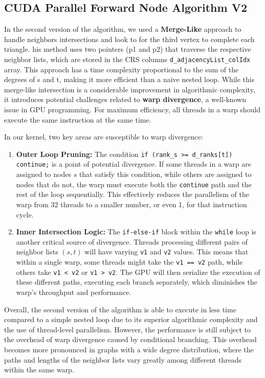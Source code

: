 \documentclass{aes2e}
\begin{document}
\subsection{CUDA Parallel Forward Node Algorithm V2}
In the second version of the algorithm, we used a \textbf{Merge-Like} approach to handle neighbors intersections and look to for the third vertex to complete each triangle. his method uses two pointers (p1 and p2) that traverse the respective neighbor lists, which are stored in the CRS columns \texttt{d\_adjacencyList\_colIdx} array. This approach has a time complexity proportional to the sum of the degrees of s and t, making it more efficient than a naive nested loop. 
While this merge-like intersection is a considerable improvement in algorithmic complexity, it introduces potential challenges related to \textbf{warp divergence}, a well-known issue in GPU programming. For maximum efficiency, all threads in a warp should execute the same instruction at the same time.

In our kernel, two key areas are susceptible to warp divergence:

\begin{enumerate}
    \item \textbf{Outer Loop Pruning:} The condition \texttt{if (rank\_s >= d\_ranks[t]) continue;} is a point of potential divergence. If some threads in a warp are assigned to nodes $s$ that satisfy this condition, while others are assigned to nodes that do not, the warp must execute both the \texttt{continue} path and the rest of the loop sequentially. This effectively reduces the parallelism of the warp from 32 threads to a smaller number, or even 1, for that instruction cycle.
    
    \item \textbf{Inner Intersection Logic:} The \texttt{if-else-if} block within the \texttt{while} loop is another critical source of divergence. Threads processing different pairs of neighbor lists $(s, t)$ will have varying \texttt{v1} and \texttt{v2} values. This means that within a single warp, some threads might take the \texttt{v1 == v2} path, while others take \texttt{v1 < v2} or \texttt{v1 > v2}. The GPU will then serialize the execution of these different paths, executing each branch separately, which diminishes the warp's throughput and performance.
\end{enumerate}

Overall, the second version of the algorithm is able to execute in less time compared to a simple nested loop due to its superior algorithmic complexity and the use of thread-level parallelism. However, the performance is still subject to the overhead of warp divergence caused by conditional branching. This overhead becomes more pronounced in graphs with a wide degree distribution, where the paths and lengths of the neighbor lists vary greatly among different threads within the same warp.
\end{document}
